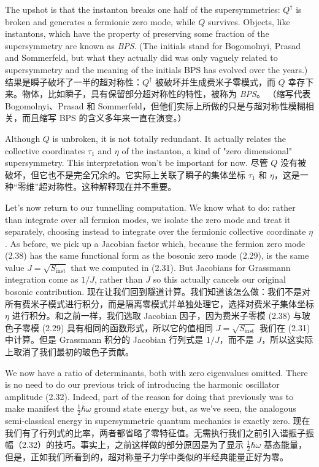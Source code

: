 \documentclass{ctexart}
\begin{document}
\begin{paracol}{2}
The upshot is that the instanton breaks one half of the supersymmetries: $Q^{\dagger}$ is broken and generates a fermionic zero mode, while $Q$ survives. Objects, like instantons, which have the property of preserving some fraction of the supersymmetry are known as \textit{BPS}. (The initials stand for Bogomolnyi, Prasad and Sommerfeld, but what they actually did was only vaguely related to supersymmetry and the meaning of the initials BPS has evolved over the years.)
\switchcolumn
结果是瞬子破坏了一半的超对称性：$Q^{\dagger}$ 被破坏并生成费米子零模式，而 $Q$ 幸存下来。物体，比如瞬子，具有保留部分超对称性的特性，被称为 \textit{BPS}。 （缩写代表 Bogomolnyi、Prasad 和 Sommerfeld，但他们实际上所做的只是与超对称性模糊相关，而且缩写 BPS 的含义多年来一直在演变。）
\switchcolumn*

Although $Q$ is unbroken, it is not totally redundant. It actually relates the collective coordinates $\tau_1$ and $\eta$ of the instanton, a kind of "zero dimensional" supersymmetry. This interpretation won’t be important for now.
\switchcolumn
尽管 $Q$ 没有被破坏，但它也不是完全冗余的。它实际上关联了瞬子的集体坐标 $\tau_1$ 和 $\eta$，这是一种“零维”超对称性。这种解释现在并不重要。
\switchcolumn*

Let’s now return to our tunnelling computation. We know what to do: rather than integrate over all fermion modes, we isolate the zero mode and treat it separately, choosing instead to integrate over the fermionic collective coordinate $\eta$. As before, we pick up a Jacobian factor which, because the fermion zero mode (2.38) has the same functional form as the bosonic zero mode (2.29), is the same value $J = \sqrt{S_{\text{inst}}}$ that we computed in (2.31). But Jacobians for Grassmann integration come as $1 / J$, rather than $J$ so this actually cancels our original bosonic contribution.
\switchcolumn
现在让我们回到隧道计算。我们知道该怎么做：我们不是对所有费米子模式进行积分，而是隔离零模式并单独处理它，选择对费米子集体坐标 $\eta$ 进行积分。和之前一样，我们选取​ Jacobian 因子，因为费米子零模 (2.38) 与玻色子零模 (2.29) 具有相同的函数形式，所以它的值相同 $J = \sqrt{S_{\text{inst} }}$ 我们在 (2.31) 中计算。但是 Grassmann 积分的 Jacobian 行列式是 $1 / J$，而不是 $J$，所以这实际上取消了我们最初的玻色子贡献。
\switchcolumn*

We now have a ratio of determinants, both with zero eigenvalues omitted. There is no need to do our previous trick of introducing the harmonic oscillator amplitude (2.32). Indeed, part of the reason for doing that previously was to make manifest the $\frac{1}{2} \hbar \omega$ ground state energy but, as we’ve seen, the analogous semi-classical energy in supersymmetric quantum mechanics is exactly zero.
\switchcolumn
现在我们有了行列式的比率，两者都省略了零特征值。无需执行我们之前引入谐振子振幅（2.32）的技巧。事实上，之前这样做的部分原因是为了显示 $\frac{1}{2} \hbar \omega$ 基态能量，但是，正如我们所看到的，超对称量子力学中类似的半经典能量正好为零。
\switchcolumn*

\end{paracol}
\end{document}
